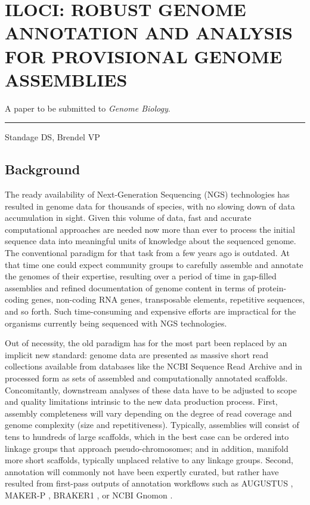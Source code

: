 \chapter{ILOCI: ROBUST GENOME ANNOTATION AND ANALYSIS FOR PROVISIONAL GENOME ASSEMBLIES}

A paper to be submitted to \textit{Genome Biology}.

\noindent\hfil\rule{0.5\textwidth}{.4pt}\hfil

Standage DS, Brendel VP


\section{Background}

The ready availability of Next-Generation Sequencing (NGS) technologies has resulted in genome data for thousands of species, with no slowing down of data accumulation in sight.
Given this volume of data, fast and accurate computational approaches are needed now more than ever to process the initial sequence data into meaningful units of knowledge about the sequenced genome.
The conventional paradigm for that task from a few years ago is outdated.
At that time one could expect community groups to carefully assemble and annotate the genomes of their expertise, resulting over a period of time in gap-filled assemblies and refined documentation of genome content in terms of protein-coding genes, non-coding RNA genes, transposable elements, repetitive sequences, and so forth.
Such time-consuming and expensive efforts are impractical for the organisms currently being sequenced with NGS technologies.

Out of necessity, the old paradigm has for the most part been replaced by an implicit new standard:  genome data are presented as massive short read  collections available from databases like the NCBI Sequence Read Archive \cite{SRA} and in processed form as sets of assembled and computationally annotated scaffolds.
Concomitantly, downstream analyses of these data have to be adjusted to  scope and quality limitations intrinsic to the new data production process.
First, assembly completeness will vary depending on the degree of read coverage and genome complexity (size and repetitiveness).
Typically, assemblies will consist of tens to hundreds of large scaffolds, which in the best case can be ordered into linkage groups that approach pseudo-chromosomes; and in addition, manifold more short scaffolds, typically unplaced relative to any linkage groups.
Second, annotation will commonly not have been expertly curated, but rather have resulted from first-pass outputs of annotation workflows such as AUGUSTUS \cite{AUGUSTUS}, MAKER-P \cite{MAKERP}, BRAKER1 \cite{BRAKER1}, or NCBI Gnomon \cite{Gnomon}.

